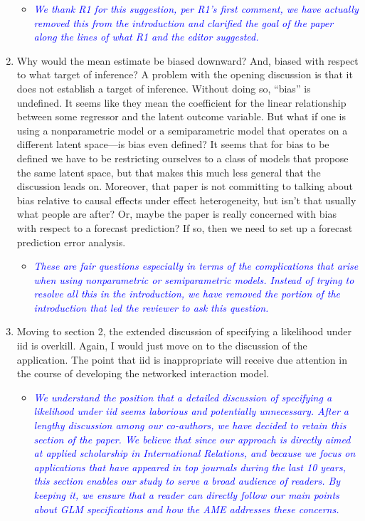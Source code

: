 \begin{enumerate}
	\begin{itemize}
		\item  \emph{ \textcolor{blue}{
		We thank R1 for this suggestion, per R1's first comment, we have actually removed this from the introduction and clarified the goal of the paper along the lines of what R1 and the editor suggested.
		}}
	\end{itemize}
	\item Why would the mean estimate be biased downward?  And, biased with respect to what target of inference?  A problem with the opening discussion is that it does not establish a target of inference.  Without doing so, ``bias'' is undefined.  It seems like they mean the coefficient for the linear relationship between some regressor and the latent outcome variable. But what if one is using a nonparametric model or a semiparametric model that operates on a different latent space---is bias even defined?  It seems that for bias to be defined we have to be restricting ourselves to a class of models that propose the same latent space, but that makes this much less general that the discussion leads on.  Moreover, that paper is not committing to talking about bias relative to causal effects under effect heterogeneity, but isn't that usually what people are after?  Or, maybe the paper is really concerned with bias with respect to a forecast prediction? If so, then we need to set up a forecast prediction error analysis.
	\begin{itemize}
		\item  \emph{ \textcolor{blue}{
		These are fair questions especially in terms of the complications that arise when using nonparametric or semiparametric models. Instead of trying to resolve all this in the introduction, we have removed the portion of the introduction that led the reviewer to ask this question.
		}}
	\end{itemize}
	\item Moving to section 2, the extended discussion of specifying a likelihood under iid is overkill.  Again, I would just move on to the discussion of the application. The point that iid is inappropriate will receive due attention in the course of developing the networked interaction model.
	\begin{itemize}
		\item  \emph{ \textcolor{blue}{
		We understand the position that a detailed discussion of specifying a likelihood under iid seems laborious and potentially unnecessary. After a lengthy discussion among our co-authors, we have decided to retain this section of the paper. We believe that since our approach is directly aimed at applied scholarship in International Relations, and because we focus on applications that have appeared in top journals during the last 10 years, this section enables our study to serve a broad audience of readers. By keeping it, we ensure that a reader can directly follow our main points about GLM specifications and how the AME addresses these concerns.
}}
\end{itemize}
\end{enumerate}

